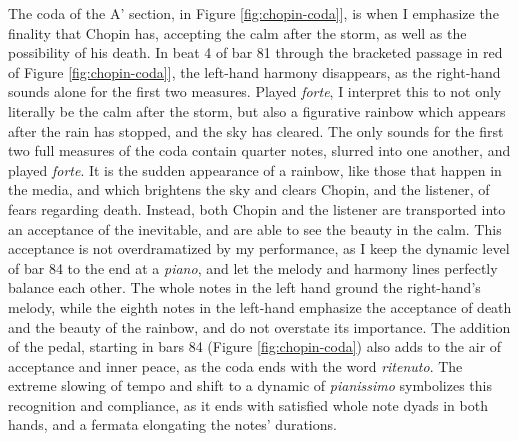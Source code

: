 The coda of the A' section, in Figure \ref{fig:chopin-coda}]\autocite{Hansen_1973}, is when I emphasize the finality that Chopin has, accepting the calm after the storm, as well as the possibility of his death. In beat 4 of bar 81 through the bracketed passage in red of Figure  \ref{fig:chopin-coda}]\autocite{Hansen_1973}, the left-hand harmony disappears, as the right-hand sounds alone for the first two measures. Played \textit{forte}, I interpret this to not only literally be the calm after the storm, but also a figurative rainbow which appears after the rain has stopped, and the sky has cleared. The only sounds for the first two full measures of the coda contain quarter notes, slurred into one another, and played \textit{forte}. It is the sudden appearance of a rainbow, like those that happen in the media, and which brightens the sky and clears Chopin, and the listener, of fears regarding death. Instead, both Chopin and the listener are transported into an acceptance of the inevitable, and are able to see the beauty in the calm. This acceptance is not overdramatized by my performance, as I keep the dynamic level of bar 84 to the end at a \textit{piano}, and let the melody and harmony lines perfectly balance each other. The whole notes in the left hand ground the right-hand's melody, while the eighth notes in the left-hand emphasize the acceptance of death and the beauty of the rainbow, and do not overstate its importance. The addition of the pedal, starting in bars 84 (Figure \ref{fig:chopin-coda}\autocite{Hansen_1973}) also adds to the air of acceptance and inner peace, as the coda ends with the word \textit{ritenuto}. The extreme slowing of tempo and shift to a dynamic of \textit{pianissimo} symbolizes this recognition and compliance, as it ends with satisfied whole note dyads in both hands, and a fermata elongating the notes' durations.
%
